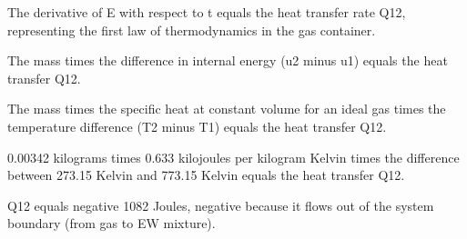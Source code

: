 The derivative of E with respect to t equals the heat transfer rate Q12, representing the first law of thermodynamics in the gas container.

The mass times the difference in internal energy (u2 minus u1) equals the heat transfer Q12.

The mass times the specific heat at constant volume for an ideal gas times the temperature difference (T2 minus T1) equals the heat transfer Q12.

0.00342 kilograms times 0.633 kilojoules per kilogram Kelvin times the difference between 273.15 Kelvin and 773.15 Kelvin equals the heat transfer Q12.

Q12 equals negative 1082 Joules, negative because it flows out of the system boundary (from gas to EW mixture).